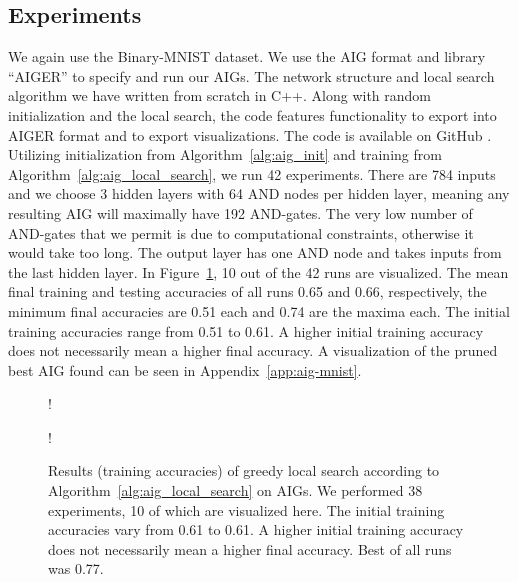 \subsection{Experiments}
We again use the Binary-MNIST dataset. We use the AIG format and library \enquote{AIGER} \cite{bib:Biere-FMV-TR-07-1} to specify and run our AIGs. The network structure and local search algorithm we have written from scratch in C++. Along with random initialization and the local search, the code features functionality to export into AIGER format and to export visualizations. The code is available on GitHub \cite{bib:aig_github}. Utilizing initialization from Algorithm~\ref{alg:aig_init} and training from Algorithm~\ref{alg:aig_local_search}, we run 42 experiments. There are 784 inputs and we choose 3 hidden layers with 64 AND nodes per hidden layer, meaning any resulting AIG will maximally have 192 AND-gates. The very low number of AND-gates that we permit is due to computational constraints, otherwise it would take too long. The output layer has one AND node and takes inputs from the last hidden layer. In Figure~\ref{fig:aig_exp_result}, 10 out of the 42 runs are visualized. The mean final training and testing accuracies of all runs 0.65 and 0.66, respectively, the minimum final accuracies are 0.51 each and 0.74 are the maxima each. The initial training accuracies range from 0.51 to 0.61. A higher initial training accuracy does not necessarily mean a higher final accuracy. A visualization of the pruned best AIG found can be seen in Appendix~\ref{app:aig-mnist}.

\begin{figure}[!htb]
    \centering
  \begin{minipage}[b]{.49\linewidth}
    \resizebox {1\textwidth} {!} {
    
    }
    \label{fig:aix_exp_result:train}
  \end{minipage}
  \begin{minipage}[b]{.49\linewidth}
    \resizebox {1\textwidth} {!} {
    
    }
    \label{fig:aig_exp_result:test}
  \end{minipage}
  \caption{Results (training accuracies) of greedy local search according to Algorithm~\ref{alg:aig_local_search} on AIGs. We performed 38 experiments, 10 of which are visualized here. The initial training accuracies vary from 0.61 to 0.61. A higher initial training accuracy does not necessarily mean a higher final accuracy. Best of all runs was 0.77.}
\label{fig:aig_exp_result}
\end{figure}
\FloatBarrier


